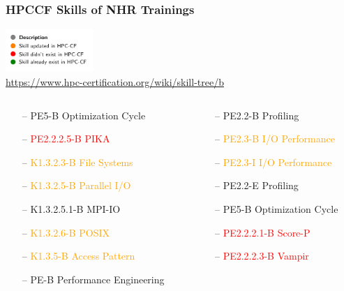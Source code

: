 \documentclass[compress,aspectratio=169]{beamer}
\begin{document}
\begin{frame}
\frametitle{HPCCF Skills of NHR Trainings}
   \includegraphics[width=0.25\textwidth]{hpccf_skills.pdf}
   \\
   \url{https://www.hpc-certification.org/wiki/skill-tree/b}
\begin{columns}[T]
\begin{column}{0.5\textwidth}
\begin{itemize}[itemsep=0pt]
 \item[--] \textcolor{green!50!black}{PE5-B Optimization Cycle} 
 \item[--] \textcolor{red}{PE2.2.2.5-B PIKA}
\item[--]  \textcolor{orange}{K1.3.2.3-B File Systems}
\item[--] \textcolor{orange}{K1.3.2.5-B Parallel I/O}
\item[--] \textcolor{green!50!black}{K1.3.2.5.1-B MPI-IO}
\item[--] \textcolor{orange}{K1.3.2.6-B POSIX}
\item[--]  \textcolor{orange}{K1.3.5-B Access Pattern}
 \item[--] \textcolor{green!50!black}{PE-B Performance Engineering}
\end{itemize}
\end{column}
\hspace{-0.5cm}
\begin{column}{0.65\textwidth}
\begin{itemize}[itemsep=0pt]
 \item[--] \textcolor{green!50!black}{PE2.2-B Profiling}
 \item[--] \textcolor{orange}{PE2.3-B I/O Performance}
 \item[--] \textcolor{orange}{PE2.3-I I/O Performance}
 \item[--] \textcolor{green!50!black}{PE2.2-E Profiling}
 \item[--] \textcolor{green!50!black}{ PE5-B Optimization Cycle}
 \item[--] \textcolor{red}{PE2.2.2.1-B Score-P}
 \item[--] \textcolor{red}{PE2.2.2.3-B Vampir}
\end{itemize}
\end{column}

\end{columns}
\end{frame}


\end{document}
